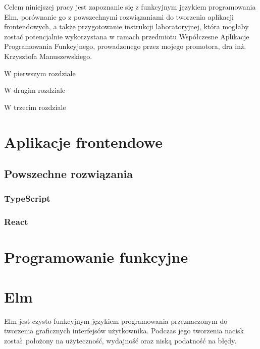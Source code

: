 \documentclass[twoside,a4paper]{book}
\begin{document}
Celem niniejszej pracy jest zapoznanie się z funkcyjnym językiem programowania Elm, porównanie go z powszechnymi rozwiązaniami do tworzenia aplikacji frontendowych, a także przygotowanie instrukcji laboratoryjnej, która mogłaby zostać potencjalnie wykorzystana w ramach przedmiotu Współczesne Aplikacje Programowania Funkcyjnego, prowadzonego przez mojego promotora, dra inż. Krzysztofa Manuszewskiego.

W pierwszym rozdziale

W drugim rozdziale

W trzecim rozdziale

\chapter{Aplikacje frontendowe}

\section{Powszechne rozwiązania}
\subsection{TypeScript}
\subsection{React}

\chapter{Programowanie funkcyjne}

\chapter{Elm}
Elm jest czysto funkcyjnym językiem programowania przeznaczonym do tworzenia graficznych interfejsów użytkownika. Podczas jego tworzenia nacisk został położony na użyteczność, wydajność oraz niską podatność na błędy.
\end{document}
